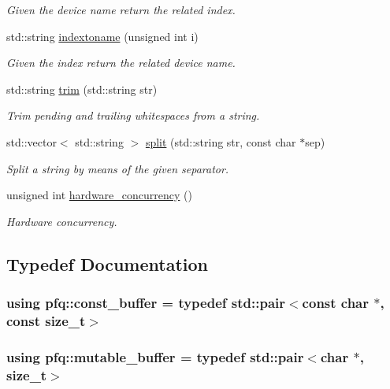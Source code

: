 \begin{DoxyCompactItemize}
\begin{DoxyCompactList}\small\item\em Given the device name return the related index. \end{DoxyCompactList}\item 
std\+::string \hyperlink{namespacepfq_a7bf753b90ae15e20c86f40ba59c87c36}{indextoname} (unsigned int i)
\begin{DoxyCompactList}\small\item\em Given the index return the related device name. \end{DoxyCompactList}\item 
std\+::string \hyperlink{namespacepfq_a02a1861a64cc518394d3cc4361799c9f}{trim} (std\+::string str)
\begin{DoxyCompactList}\small\item\em Trim pending and trailing whitespaces from a string. \end{DoxyCompactList}\item 
std\+::vector$<$ std\+::string $>$ \hyperlink{namespacepfq_a0c3aeb61dfd544cb08cb240202caf213}{split} (std\+::string str, const char $\ast$sep)
\begin{DoxyCompactList}\small\item\em Split a string by means of the given separator. \end{DoxyCompactList}\item 
unsigned int \hyperlink{namespacepfq_a9a9e9be8b77976ed45483448f54de1f9}{hardware\+\_\+concurrency} ()
\begin{DoxyCompactList}\small\item\em Hardware concurrency. \end{DoxyCompactList}\end{DoxyCompactItemize}


\subsection{Typedef Documentation}
\hypertarget{namespacepfq_ac835a1bd09b4cbaba61c100b50d0a99f}{
\subsubsection[{const\+\_\+buffer}]{\setlength{\rightskip}{0pt plus 5cm}using {\bf pfq\+::const\+\_\+buffer} = typedef std\+::pair$<$const char $\ast$, const size\+\_\+t$>$}}\label{namespacepfq_ac835a1bd09b4cbaba61c100b50d0a99f}
\hypertarget{namespacepfq_ad7b88920eaf729154354741132483ea8}{
\subsubsection[{mutable\+\_\+buffer}]{\setlength{\rightskip}{0pt plus 5cm}using {\bf pfq\+::mutable\+\_\+buffer} = typedef std\+::pair$<$char $\ast$, size\+\_\+t$>$}}\label{namespacepfq_ad7b88920eaf729154354741132483ea8}


